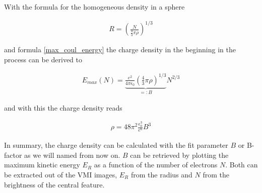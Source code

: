 With the formula for the homogeneous density in a sphere

\begin{align}
R=(\frac{N}{\frac{4}{3} \pi \rho})^{1/3}
\end{align}

and formula \ref{max_coul_energy} the charge density in the beginning in the process can be derived to

\begin{align}
E_{max}(N)=\underbrace{\frac{e^2}{4 \pi \epsilon_0} (\frac{4}{3} \pi \rho)^{1/3}}_{=:B} N^{2/3}
\end{align}

and with this the charge density reads

\begin{align}
\rho=48 \pi^2 \frac{\epsilon_0^3}{e^6} B^3
\end{align}

In summary, the charge density can be calculated with the fit parameter $B$ or B-factor as we will named from now on.  $B$ can be retrieved by plotting the maximum kinetic energy $E_R$ as a function of the number of electrons $N$. Both can be extracted out of the VMI images, $E_R$ from the radius and $N$ from the brightness of the central feature.

